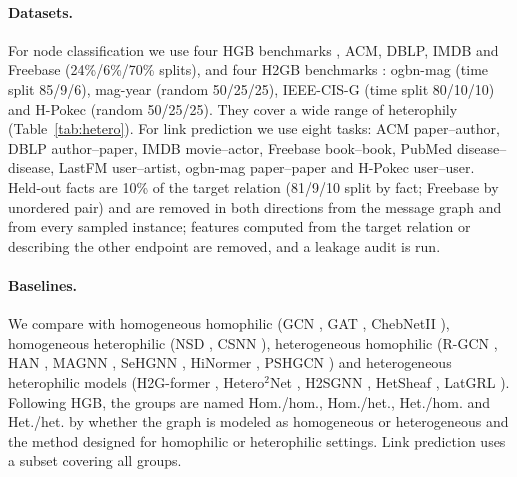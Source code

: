 \documentclass{article}
\begin{document}
\paragraph{Datasets.} For node classification we use four HGB benchmarks \cite{lv2021hgb}, ACM, DBLP, IMDB and Freebase (24\%/6\%/70\% splits), and four H2GB benchmarks \cite{lin2025heterophily}: ogbn-mag (time split 85/9/6), mag-year (random 50/25/25), IEEE-CIS-G (time split 80/10/10) and H-Pokec (random 50/25/25). They cover a wide range of heterophily (Table~\ref{tab:hetero}). For link prediction we use eight tasks: ACM paper--author, DBLP author--paper, IMDB movie--actor, Freebase book--book, PubMed disease--disease, LastFM user--artist, ogbn-mag paper--paper and H-Pokec user--user. Held-out facts are 10\% of the target relation (81/9/10 split by fact; Freebase by unordered pair) and are removed in both directions from the message graph and from every sampled instance; features computed from the target relation or describing the other endpoint are removed, and a leakage audit is run.

\paragraph{Baselines.} We compare with homogeneous homophilic (GCN \cite{kipf2017gcn}, GAT \cite{velickovic2018gat}, ChebNetII \cite{he2022chebnetii}), homogeneous heterophilic (NSD \cite{bodnar2022neural}, CSNN \cite{ribeiro2026cooperative}), heterogeneous homophilic (R-GCN \cite{schlichtkrull2018rgcn}, HAN \cite{wang2019han}, MAGNN \cite{fu2020magnn}, SeHGNN \cite{yang2023sehgnn}, HiNormer \cite{mao2023hinormer}, PSHGCN \cite{he2024spectral}) and heterogeneous heterophilic models (H2G-former \cite{lin2025heterophily}, Hetero$^2$Net \cite{li2025hetero2net}, H2SGNN \cite{lu2026addressing}, HetSheaf \cite{braithwaite2024heterogeneous}, LatGRL \cite{shen2025heterophily}). Following HGB, the groups are named Hom./hom., Hom./het., Het./hom. and Het./het. by whether the graph is modeled as homogeneous or heterogeneous and the method designed for homophilic or heterophilic settings. Link prediction uses a subset covering all groups.
\end{document}
